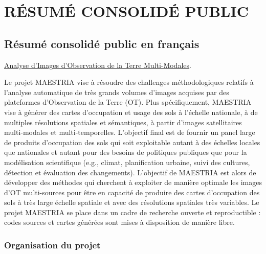 \section{R\'ESUM\'E CONSOLID\'E PUBLIC}
\label{sec:resume}

\subsection{Résumé consolidé public en français}
\underline{Analyse d'Images d'Observation de la Terre Multi-Modales}.

Le projet MAESTRIA vise à résoudre des challenges méthodologiques relatifs à l’analyse automatique de très grands volumes d’images acquises par des plateformes d’Observation de la Terre (OT). Plus spécifiquement, MAESTRIA vise à générer des cartes d’occupation et usage des sols à l’échelle nationale, à de multiples résolutions spatiales et sémantiques, à partir d’images satellitaires multi-modales et multi-temporelles. L’objectif final est de fournir un panel large de produits d’occupation des sols qui soit exploitable autant à des échelles locales que nationales et autant pour des besoins de politiques publiques que pour la modélisation scientifique (e.g., climat, planification urbaine, suivi des cultures, détection et évaluation des changements). L’objectif de MAESTRIA est alors de développer des méthodes qui cherchent à exploiter de manière optimale les images d’OT multi-sources pour être en capacité de produire des cartes d’occupation des sols à très large échelle spatiale et avec des résolutions spatiales très variables. Le projet MAESTRIA se place dans un cadre de recherche ouverte et reproductible : codes sources et cartes générées sont mises à disposition de manière libre.

\subsubsection*{Organisation du projet}

